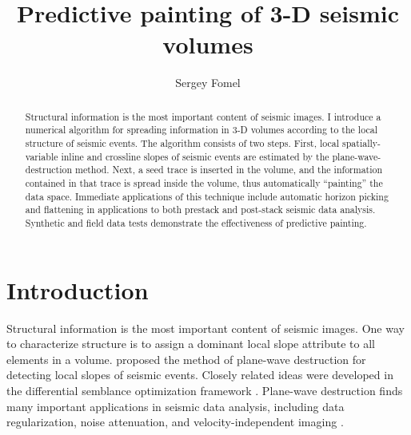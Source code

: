 
\title{Predictive painting of 3-D seismic volumes}
\author{Sergey Fomel}

\address{
sergey.fomel@beg.utexas.edu \\
John A. and Katherine G. Jackson School of Geosciences \\
The University of Texas at Austin \\
University Station, Box X \\
Austin, TX 78713-8924}


\maketitle

\begin{abstract}
  Structural information is the most important content of seismic
  images. I introduce a numerical algorithm for spreading information
  in 3-D volumes according to the local structure of seismic
  events. The algorithm consists of two steps. First, local
  spatially-variable inline and crossline slopes of seismic events are
  estimated by the plane-wave-destruction method. Next, a seed trace
  is inserted in the volume, and the information contained in that
  trace is spread inside the volume, thus automatically ``painting''
  the data space. Immediate applications of this technique include
  automatic horizon picking and flattening in applications to both
  prestack and post-stack seismic data analysis. Synthetic and field
  data tests demonstrate the effectiveness of predictive painting.
\end{abstract}

\section{Introduction}

Structural information is the most important content of seismic
images. One way to characterize structure is to assign a dominant
local slope attribute to all elements in a volume. \cite{pvi} proposed
the method of plane-wave destruction for detecting local slopes of
seismic events. Closely related ideas were developed in the
differential semblance optimization framework
\cite[]{symes,kim}. Plane-wave destruction finds many important
applications in seismic data analysis, including data regularization,
noise attenuation, and velocity-independent imaging
\cite[]{GEO67-06-19461960,pmig,diffr,will}.

